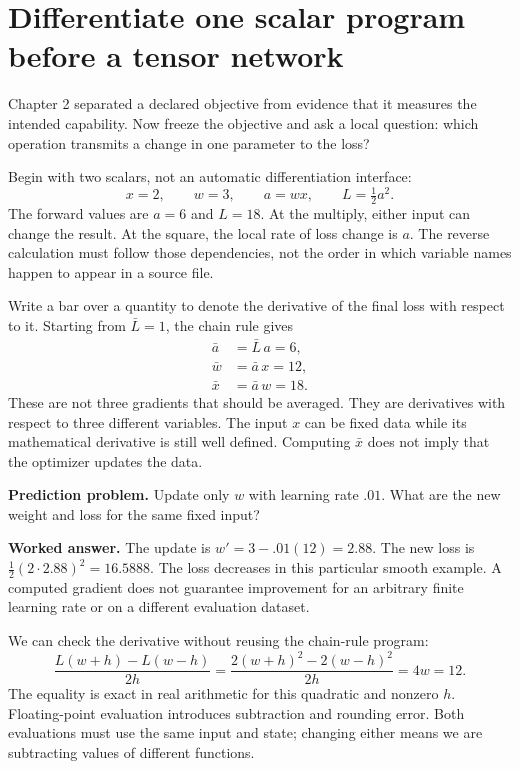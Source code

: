 \section{Differentiate one scalar program before a tensor network}
Chapter 2 separated a declared objective from evidence that it measures the
intended capability. Now freeze the objective and ask a local question: which
operation transmits a change in one parameter to the loss?

Begin with two scalars, not an automatic differentiation interface:
\begin{equation}
x=2,\qquad w=3,\qquad a=wx,\qquad L=\tfrac12a^2.
\end{equation}
The forward values are $a=6$ and $L=18$. At the multiply, either input can
change the result. At the square, the local rate of loss change is $a$.
The reverse calculation must follow those dependencies, not the order in
which variable names happen to appear in a source file.


Write a bar over a quantity to denote the derivative of the final loss with
respect to it. Starting from $\bar L=1$, the chain rule gives
\begin{align}
\bar a&=\bar L\,a=6,\\
\bar w&=\bar a\,x=12,\\
\bar x&=\bar a\,w=18.
\end{align}
These are not three gradients that should be averaged. They are derivatives
with respect to three different variables. The input $x$ can be fixed data
while its mathematical derivative is still well defined. Computing $\bar x$
does not imply that the optimizer updates the data.

\textbf{Prediction problem.} Update only $w$ with learning rate $.01$.
What are the new weight and loss for the same fixed input?

\textbf{Worked answer.} The update is $w'=3-.01(12)=2.88$.
The new loss is $\frac12(2\cdot2.88)^2=16.5888$. The loss decreases in this
particular smooth example. A computed gradient does not guarantee improvement
for an arbitrary finite learning rate or on a different evaluation dataset.

We can check the derivative without reusing the chain-rule program:
\begin{equation}
\frac{L(w+h)-L(w-h)}{2h}
=\frac{2(w+h)^2-2(w-h)^2}{2h}=4w=12.
\end{equation}
The equality is exact in real arithmetic for this quadratic and nonzero $h$.
Floating-point evaluation introduces subtraction and rounding error. Both
evaluations must use the same input and state; changing either means we are
subtracting values of different functions.

